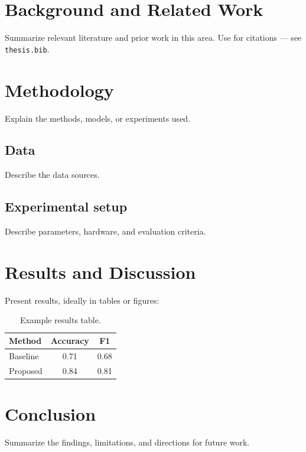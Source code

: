 \documentclass[12pt,a4paper,oneside]{report}
\begin{document}
\chapter{Background and Related Work}
\label{ch:background}

Summarize relevant literature and prior work in this area. Use
\cite{knuth1984tex} for citations --- see \texttt{thesis.bib}.

\chapter{Methodology}
\label{ch:methodology}

Explain the methods, models, or experiments used.

\section{Data}
Describe the data sources.

\section{Experimental setup}
Describe parameters, hardware, and evaluation criteria.

\chapter{Results and Discussion}
\label{ch:results}

Present results, ideally in tables or figures:

\begin{table}[h]
  \centering
  \caption{Example results table.}
  \begin{tabular}{lcc}
    \toprule
    Method & Accuracy & F1 \\
    \midrule
    Baseline & 0.71 & 0.68 \\
    Proposed & 0.84 & 0.81 \\
    \bottomrule
  \end{tabular}
\end{table}

\chapter{Conclusion}
\label{ch:conclusion}

Summarize the findings, limitations, and directions for future work.



\end{document}
